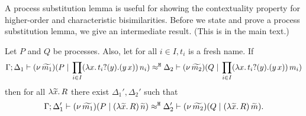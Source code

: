 A process substitution lemma is useful for showing the
contextuality property for higher-order and characteristic bisimilarities.
Before we state and prove a process substitution lemma,
we give an intermediate result.
(This is  in the main text.)

\begin{lemma}
	\label{lem:trigger_subst}
	Let $P$ and $Q$ be processes. Also, let for all $i \in I, t_i$ is a fresh name. If
	\[
		\Gamma; \Delta_1 \vdash (\nu\, \widetilde{m_1})(P \;|\; \prod_{i \in I} (\lambda x.\,t_i ? (y) . (y\, {x}))\, {n_i} ) \approx^\mathtt{H} \Delta_2 \vdash (\nu\, \widetilde{m_2})(Q \;|\;\prod_{i \in I} (\lambda x.\,t_i ? (y) . (y\, {x}))\, {m_i} )
	\]
	then for all $\lambda \widetilde{x}.\,R$ there exist $\Delta_1', \Delta_2'$ such that
	\[
		\Gamma; \Delta_1' \vdash (\nu\, \widetilde{m_1})(P \;|\; (\lambda \widetilde{x}.\,R)\, {\widetilde{n}} ) \approx^\mathtt{H} \Delta_2' \vdash (\nu\, \widetilde{m_2})(Q \;|\; (\lambda \widetilde{x}.\,R)\, {\widetilde{m}} ).
	\]
\end{lemma}

